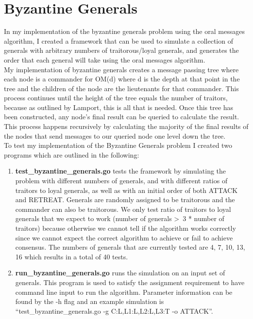 \documentclass[11pt]{article}
\begin{document}
\pagebreak

\section{Byzantine Generals}
In my implementation of the byzantine generals problem using the oral messages algorithm, I created a framework that can be used to simulate a collection of generals with arbitrary numbers of traitorous/loyal generals, and generates the order that each general will take using the oral messages algorithm.\\

My implementation of byzantine generals creates a message passing tree where each node is a commander for OM(d) where d is the depth at that point in the tree and the children of the node are the lieutenants for that commander. This process continues until the height of the tree equals the number of traitors, because as outlined by Lamport, this is all that is needed. Once this tree has been constructed, any node's final result can be queried to calculate the result. This process happens recursively by calculating the majority of the final results of the nodes that send messages to our queried node one level down the tree.\\

To test my implementation of the Byzantine Generals problem I created two programs which are outlined in the following:
\begin{enumerate}
\item
\textbf{test\_byzantine\_generals.go} tests the framework by simulating the problem with different numbers of generals, and with different ratios of traitors to loyal generals, as well as with an initial order of both ATTACK and RETREAT. Generals are randomly assigned to be traitorous and the commander can also be traitorous. We only test ratio of traitors to loyal generals that we expect to work (number of generals \textgreater\ 3 * number of traitors) because otherwise we cannot tell if the algorithm works correctly since we cannot expect the correct algorithm to achieve or fail to achieve consensus. The numbers of generals that are currently tested are 4, 7, 10, 13, 16 which results in a total of 40 tests.

\item
\textbf{run\_byzantine\_generals.go} runs the simulation on an input set of generals. This program is used to satisfy the assignment requirement to have command line input to run the algorithm. Parameter information can be found by the -h flag and an example simulation is “test\_byzantine\_generals.go -g C:L,L1:L,L2:L,L3:T -o ATTACK”.
\end{enumerate}
\end{document}
